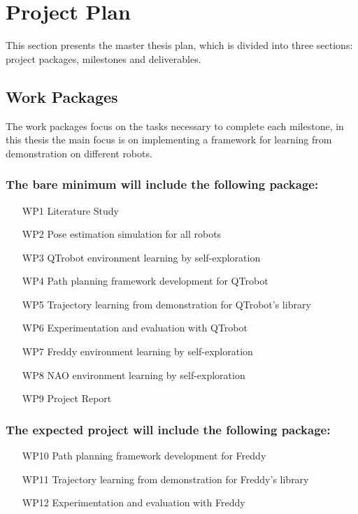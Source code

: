 \documentclass[thesis]{mas_proposal}
\begin{document}
\section{Project Plan}

	This section presents the master thesis plan, which is divided into three sections: project packages, milestones and deliverables.

	\subsection{Work Packages}
	
	The work packages focus on the tasks necessary to complete each milestone, in this thesis the main focus is on implementing a framework for learning from demonstration on different robots.
	
	\subsubsection{The bare minimum will include the following package:}

		\begin{enumerate}
		    \item[WP1] Literature Study
		    \item[WP2] Pose estimation simulation for all robots
		    \item[WP3] QTrobot environment learning by self-exploration
		    \item[WP4] Path planning framework development for QTrobot
		    \item[WP5] Trajectory learning from demonstration for QTrobot's library
		    \item[WP6] Experimentation and evaluation with QTrobot
		    \item[WP7] Freddy environment learning by self-exploration
		    \item[WP8] NAO environment learning by self-exploration
		    \item[WP9] Project Report
		\end{enumerate}
	
	\subsubsection{The expected project will include the following package:}
	
		\begin{enumerate}
			\item[WP10] Path planning framework development for Freddy
			\item[WP11] Trajectory learning from demonstration for Freddy's library
			\item[WP12] Experimentation and evaluation with Freddy
		\end{enumerate}
	
\end{document}
